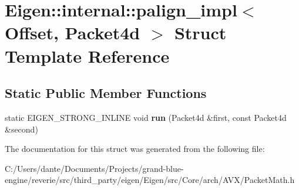 \hypertarget{struct_eigen_1_1internal_1_1palign__impl_3_01_offset_00_01_packet4d_01_4}{}\section{Eigen\+::internal\+::palign\+\_\+impl$<$ Offset, Packet4d $>$ Struct Template Reference}
\label{struct_eigen_1_1internal_1_1palign__impl_3_01_offset_00_01_packet4d_01_4}
\subsection*{Static Public Member Functions}
\begin{DoxyCompactItemize}
\item 
\mbox{\label{struct_eigen_1_1internal_1_1palign__impl_3_01_offset_00_01_packet4d_01_4_a3e257fc150f0bd96ef4d8578bd6fbf64}} 
static E\+I\+G\+E\+N\+\_\+\+S\+T\+R\+O\+N\+G\+\_\+\+I\+N\+L\+I\+NE void {\bfseries run} (Packet4d \&first, const Packet4d \&second)
\end{DoxyCompactItemize}


The documentation for this struct was generated from the following file\+:\begin{DoxyCompactItemize}
\item 
C\+:/\+Users/dante/\+Documents/\+Projects/grand-\/blue-\/engine/reverie/src/third\+\_\+party/eigen/\+Eigen/src/\+Core/arch/\+A\+V\+X/Packet\+Math.\+h\end{DoxyCompactItemize}
